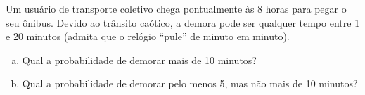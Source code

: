 %
%


\begin{exercicioBanco}[\valorquestao]
Um usuário de transporte coletivo chega pontualmente às 8 horas para pegar o seu ônibus. Devido ao trânsito caótico, a demora pode ser qualquer tempo entre 1 e 20 minutos (admita que o relógio ``pule'' de minuto em minuto).
%
\begin{enumerate}[(a)]
    \item Qual a probabilidade de demorar mais de 10 minutos?
    \item Qual a probabilidade de demorar pelo menos 5, mas não mais de 10 minutos?
\end{enumerate}
%
\end{exercicioBanco}

